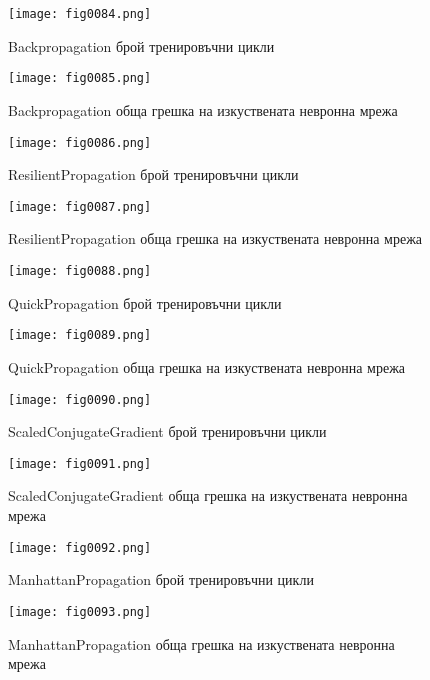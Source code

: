 \begin{figure}[H]
  \centering
  \texttt{[image: fig0084.png]}
  \caption{Backpropagation брой тренировъчни цикли}
\label{fig0084}
\end{figure}

\begin{figure}[H]
  \centering
  \texttt{[image: fig0085.png]}
  \caption{Backpropagation обща грешка на изкуствената невронна мрежа}
\label{fig0085}
\end{figure}

\begin{figure}[H]
  \centering
  \texttt{[image: fig0086.png]}
  \caption{ResilientPropagation брой тренировъчни цикли}
\label{fig0086}
\end{figure}

\begin{figure}[H]
  \centering
  \texttt{[image: fig0087.png]}
  \caption{ResilientPropagation обща грешка на изкуствената невронна мрежа}
\label{fig0087}
\end{figure}

\begin{figure}[H]
  \centering
  \texttt{[image: fig0088.png]}
  \caption{QuickPropagation брой тренировъчни цикли}
\label{fig0088}
\end{figure}

\begin{figure}[H]
  \centering
  \texttt{[image: fig0089.png]}
  \caption{QuickPropagation обща грешка на изкуствената невронна мрежа}
\label{fig0089}
\end{figure}

\begin{figure}[H]
  \centering
  \texttt{[image: fig0090.png]}
  \caption{ScaledConjugateGradient брой тренировъчни цикли}
\label{fig0090}
\end{figure}

\begin{figure}[H]
  \centering
  \texttt{[image: fig0091.png]}
  \caption{ScaledConjugateGradient обща грешка на изкуствената невронна мрежа}
\label{fig0091}
\end{figure}

\begin{figure}[H]
  \centering
  \texttt{[image: fig0092.png]}
  \caption{ManhattanPropagation брой тренировъчни цикли}
\label{fig0092}
\end{figure}

\begin{figure}[H]
  \centering
  \texttt{[image: fig0093.png]}
  \caption{ManhattanPropagation обща грешка на изкуствената невронна мрежа}
\label{fig0093}
\end{figure}

